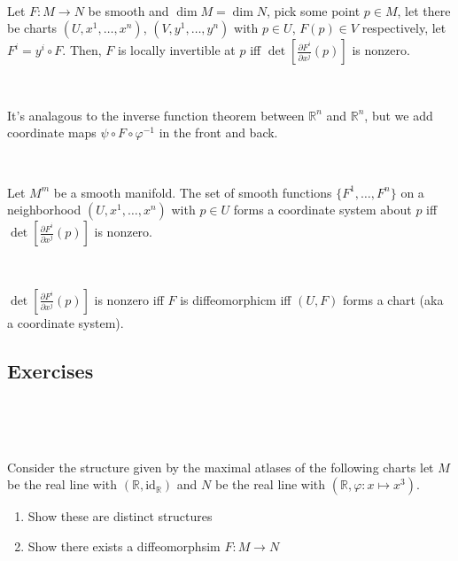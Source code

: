 \documentclass{article}
\begin{document}
\begin{theorem}
  \

  Let $F: M \to N$ be smooth and $\dim M = \dim N$, pick some point $p \in M$, let there be charts $(U, x^1, \dots, x^n)$, $(V, y^1, \dots, y^n)$ with $p \in U$, $F(p) \in V$ respectively, let $F^i = y^i \circ F$. Then, $F$ is locally invertible at $p$ iff $\det[\frac{\partial F^i}{\partial x^j}(p)]$ is nonzero.
\end{theorem}

\begin{customproof}[Idea]
  \

  It's analagous to the inverse function theorem between $\mathbb{R}^n$ and $\mathbb{R}^n$, but we add coordinate maps $\psi \circ F \circ \varphi ^{-1}$ in the front and back.
\end{customproof}

\begin{corollary}
  \

  Let $M^m$ be a smooth manifold. The set of smooth functions $\{F^1, \dots, F^n\}$ on a neighborhood $(U, x^1, \dots, x^n)$ with $p \in U$ forms a coordinate system about $p$ iff $\det[\frac{\partial F^i}{\partial x^j}(p)]$ is nonzero.
\end{corollary}

\begin{customproof}
  \

  $\det[\frac{\partial F^i}{\partial x^j}(p)]$ is nonzero iff $F$ is diffeomorphicm iff $(U, F)$ forms a chart (aka a coordinate system).
\end{customproof}

\subsection{Exercises}
\

\begin{exercise}[6.1]
  \

  Consider the structure given by the maximal atlases of the following charts let $M$ be the real line with $(\mathbb{R}, \text{id}_\mathbb{R})$ and $N$ be the real line with $(\mathbb{R}, \varphi: x \mapsto x^3)$.
  \begin{enumerate}
    \item Show these are distinct structures
    \item Show there exists a diffeomorphsim $F: M \to N$
  \end{enumerate}
\end{exercise}
\end{document}
